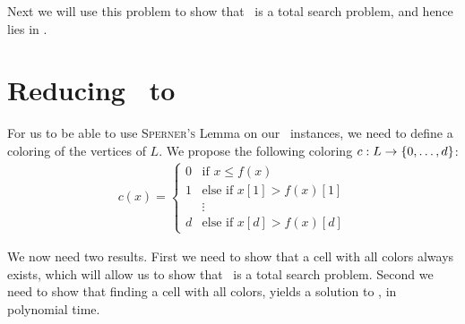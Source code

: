 Next we will use this problem to show that \Tarskistar\ is a total search problem, and hence lies in \PPAD.

\section{Reducing \Tarskistar\ to \Sperner}

For us to be able to use \textsc{Sperner's} Lemma on our \Tarskistar\ instances, we need to define a coloring of the vertices of $L$. We propose the following coloring $c : L \rightarrow \left\{0, \dots, d\right\}$:
\begin{align*}
    c(x) =
    \begin{cases}
        0 & \text{if $x \leq f(x)$}         \\
        1 & \text{else if $x[1] > f(x)[1]$} \\
          & \vdots                          \\
        d & \text{else if $x[d] > f(x)[d]$}
    \end{cases}
\end{align*}

We now need two results. First we need to show that a cell with all colors always exists, which will allow us to show that \Tarskistar\ is a total search problem. Second we need to show that finding a cell with all colors, yields a solution to \Tarskistar, in polynomial time.

